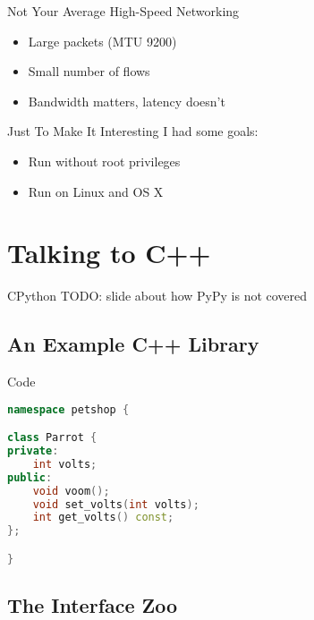 \documentclass{beamer}
\begin{document}
\begin{frame}{Not Your Average High-Speed Networking}
  \begin{itemize}
    \item Large packets (MTU 9200)
    \item Small number of flows
    \item Bandwidth matters, latency doesn't
  \end{itemize}
\end{frame}

\begin{frame}{Just To Make It Interesting}
  I had some goals:
  \begin{itemize}
    \item Run without root privileges
    \item Run on Linux and OS X
  \end{itemize}
\end{frame}

\section{Talking to C++}

\begin{frame}{CPython}
  TODO: slide about how PyPy is not covered
\end{frame}

\subsection{An Example C++ Library}

\begin{frame}[fragile=singleslide]{Code}
\begin{lstlisting}[language=c++]
namespace petshop {

class Parrot {
private:
    int volts;
public:
    void voom();
    void set_volts(int volts);
    int get_volts() const;
};

}
\end{lstlisting}
\end{frame}

\subsection{The Interface Zoo}
\end{document}

